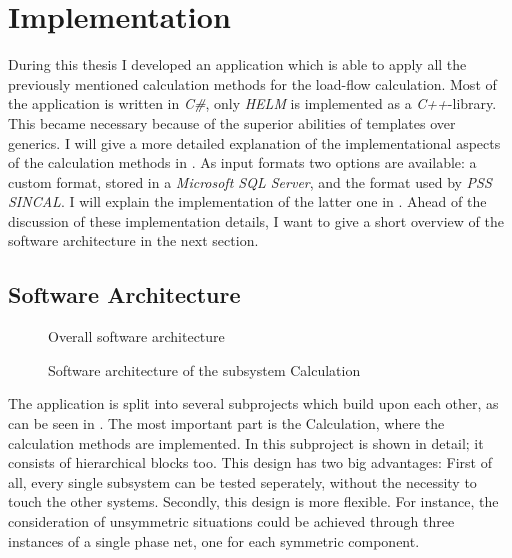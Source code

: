 \chapter{Implementation}
During this thesis I developed an application which is able to apply all the previously mentioned calculation methods for the load-flow calculation. Most of the application is written in \emph{C\#}, only \emph{HELM} is implemented as a \emph{C++}-library. This became necessary because of the superior abilities of templates over generics. I will give a more detailed explanation of the implementational aspects of the calculation methods in .
As input formats two options are available: a custom format, stored in a \emph{Microsoft SQL Server}, and the format used by \emph{PSS SINCAL}. I will explain the implementation of the latter one in . Ahead of the discussion of these implementation details, I want to give a short overview of the software architecture in the next section.

\section{Software Architecture}

\begin{figure}
	\centering
	
	\caption{Overall software architecture}
	\label{fig:software_architecture}
\end{figure}

\begin{figure}
	\centering
	
	\caption{Software architecture of the subsystem Calculation}
	\label{fig:calculation_architecture}
\end{figure}

The application is split into several subprojects which build upon each other, as can be seen in . The most important part is the Calculation, where the calculation methods are implemented. In  this subproject is shown in detail; it consists of hierarchical blocks too. This design has two big advantages: First of all, every single subsystem can be tested seperately, without the necessity to touch the other systems. Secondly, this design is more flexible. For instance, the consideration of unsymmetric situations could be achieved through three instances of a single phase net, one for each symmetric component.

